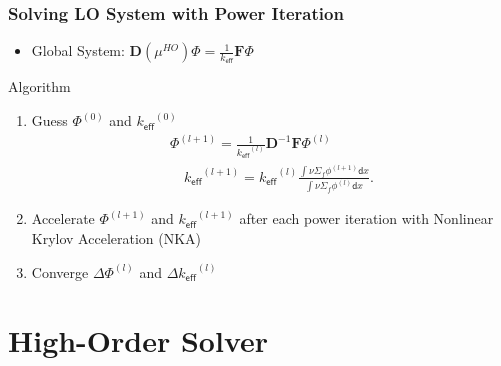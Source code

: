 \documentclass[xcolor=dvipsnames]{beamer}
\newcommand{\keff}[0]{\ensuremath{{k}_{\textsf{eff}}} }
\newcommand{\colb}[1]{{\color{blue} #1}}
\newlength{\wideitemsep}
\let\olditem\item
\renewcommand{\item}{\setlength{\itemsep}{\wideitemsep}\olditem}
\newcommand{\B}[1]{\ensuremath{\mathbf{#1}}}
\renewcommand{\d}{\mathsf{d}}
\begin{document}
\begin{frame}
    \frametitle{Solving LO System with Power Iteration}
    \begin{itemize}
        \item Global System: \hspace{0.8in}${\displaystyle \B D(\mu^{HO}) \Phi = \frac{1}{\keff} \B F \Phi}$
     \end{itemize}
     \pause
     \begin{block}{Algorithm}
         \begin{enumerate}
        \item Guess $\Phi^{(0)}$ and $\keff^{(0)}$
        \begin{align*}
    \Phi^{(l+1)} = \frac{1}{\keff^{(l)}} \B D^{-1} \B F \Phi^{(l)} \\
    \quad \keff^{(l+1)} = \keff^{(l)}\frac{ \int \nu \Sigma_f \phi^{(l+1)} \d
    x}{ \int \nu \Sigma_f \phi^{(l)}\d x }.
        \end{align*} \pause
    \item \colb{Accelerate} $\Phi^{(l+1)}$ and $\keff^{(l+1)}$ after each power iteration
        with Nonlinear Krylov Acceleration (NKA)
    \item Converge $\Delta \Phi^{(l)}$ and $\Delta \keff^{(l)}$ 
     \end{enumerate}
    \end{block}
\end{frame}

\section{High-Order Solver}
\subsection{}
\end{document}
